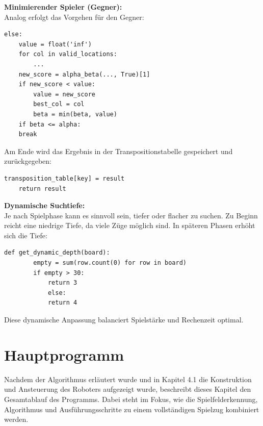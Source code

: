 \textbf{Minimierender Spieler (Gegner):}\\
Analog erfolgt das Vorgehen für den Gegner:

\begin{lstlisting}[style=pythonstyle]
	else:
	value = float('inf')
	for col in valid_locations:
		...
	new_score = alpha_beta(..., True)[1]
	if new_score < value:
		value = new_score
		best_col = col
		beta = min(beta, value)
	if beta <= alpha:
	break
\end{lstlisting}

Am Ende wird das Ergebnis in der Transpositionstabelle gespeichert und zurückgegeben:

\begin{lstlisting}[style=pythonstyle]
	transposition_table[key] = result
	return result
\end{lstlisting}

\textbf{Dynamische Suchtiefe:}\\
Je nach Spielphase kann es sinnvoll sein, tiefer oder flacher zu suchen. Zu Beginn reicht eine niedrige Tiefe, da viele Züge möglich sind. In späteren Phasen erhöht sich die Tiefe:

\begin{lstlisting}[style=pythonstyle]
	def get_dynamic_depth(board):
		empty = sum(row.count(0) for row in board)
		if empty > 30:
			return 3
			else:
			return 4
\end{lstlisting}

Diese dynamische Anpassung balanciert Spielstärke und Rechenzeit optimal.



\section{Hauptprogramm}

Nachdem der Algorithmus erläutert wurde und in Kapitel 4.1 die Konstruktion und Ansteuerung des Roboters aufgezeigt wurde, beschreibt dieses Kapitel den Gesamtablauf des Programms. Dabei steht im Fokus, wie die Spielfelderkennung, Algorithmus und Ausführungsschritte zu einem vollständigen Spielzug kombiniert werden.

